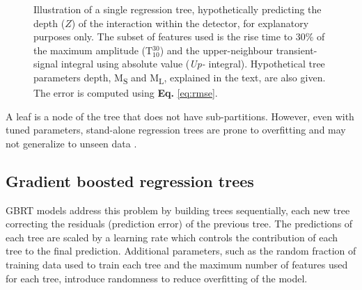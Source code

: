 \begin{figure}
\centering
{}
\caption{Illustration of a single regression tree, hypothetically predicting the depth ($Z$) of the interaction within the detector, for explanatory purposes only. The subset of features used is the rise time to 30\% of the maximum amplitude (T$_{10}^{30}$) and the upper-neighbour transient-signal integral using absolute value (\textit{Up-} integral). Hypothetical tree parameters depth, M\textsubscript{S} and M\textsubscript{L}, explained in the text, are also given. The error is computed using \textbf{Eq.} \ref{eq:rmse}.}
\label{fig:regression_tree}
\end{figure}

A leaf is a node of the tree that does not have sub-partitions. However, even with tuned parameters, stand-alone regression trees are prone to overfitting and may not generalize to unseen data \cite{hastie01statisticallearning}.

\subsection{Gradient boosted regression trees}

GBRT models address this problem by building trees sequentially, each new tree correcting the residuals (prediction error) of the previous tree. The predictions of each tree are scaled by a learning rate which controls the contribution of each tree to the final prediction. Additional parameters, such as the random fraction of training data used to train each tree and the maximum number of features used for each tree, introduce randomness to reduce overfitting of the model.

